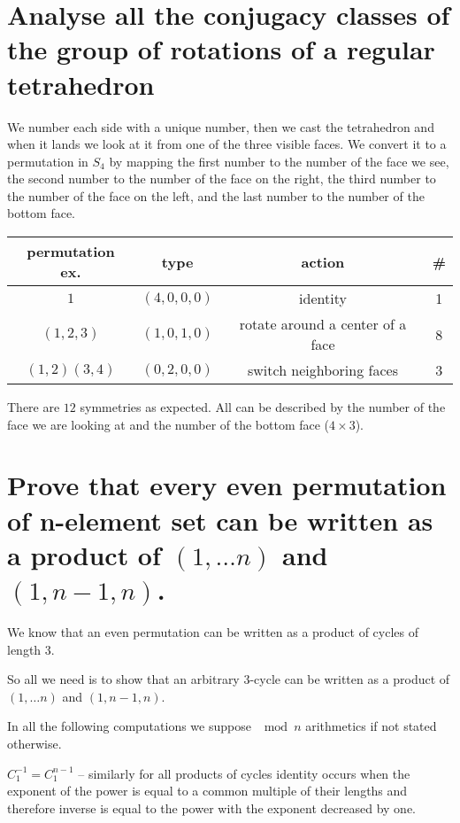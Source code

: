 \documentclass[11pt]{article}
\begin{document}
    \part*{Analyse all the conjugacy classes of the group of rotations of a regular tetrahedron}

    We number each side with a unique number, then we cast the tetrahedron and when it lands we look at it from one of the three visible faces. We convert it to a permutation in $S_4$ by mapping the first number to the number of the face we see, the second number to the number of the face on the right, the third number to the number of the face on the left, and the last number to the number of the bottom face.

    \begin{tabular}{|c|c|c|c|}
        \hline
        \textbf{permutation ex.} & \textbf{type} & \textbf{action} & \textbf{\#} \\ \hline
        $1$ & $(4, 0, 0, 0)$ & identity & 1 \\ \hline
        $(1,2,3)$ & $(1, 0, 1, 0)$ & rotate around a center of a face & 8 \\ \hline
        $(1,2)(3,4)$ & $(0, 2, 0, 0)$ & switch neighboring faces & 3 \\ \hline
    \end{tabular}

    There are $12$ symmetries as expected. All can be described by the number of the face we are looking at and the number of the bottom face ($4 \times 3$).
    \pagebreak

    \part*{Prove that every even permutation of n-element set can be written as a product of $(1,\dots n)$ and $(1, n-1, n)$.}

    We know that an even permutation can be written as a product of cycles of length 3.

    So all we need is to show that an arbitrary 3-cycle can be written as a product of $(1,\dots n)$ and $(1, n-1, n)$.

    In all the following computations we suppose $\mod n$ arithmetics if not stated otherwise.

    $C_1^{-1} = C_1^{n - 1}$ -- similarly for all products of cycles identity occurs when the exponent of the power is equal to a common multiple of their lengths and therefore inverse is equal to the power with the exponent decreased by one.
\end{document}

